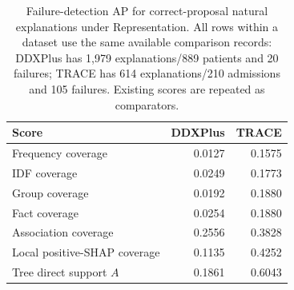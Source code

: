 \begin{table}[!htbp]
\centering\small
\caption{Failure-detection AP for correct-proposal natural explanations under Representation. All rows within a dataset use the same available comparison records: DDXPlus has 1,979 explanations/889 patients and 20 failures; TRACE has 614 explanations/210 admissions and 105 failures. Existing scores are repeated as comparators.}\label{tab:extra-natural}
\begin{tabular}{lrr}\toprule
Score & DDXPlus & TRACE\\\midrule
Frequency coverage & 0.0127 & 0.1575 \\
IDF coverage & 0.0249 & 0.1773 \\
Group coverage & 0.0192 & 0.1880 \\
Fact coverage & 0.0254 & 0.1880 \\
Association coverage & 0.2556 & 0.3828 \\
Local positive-SHAP coverage & 0.1135 & 0.4252 \\
Tree direct support $A$ & 0.1861 & 0.6043 \\
\bottomrule\end{tabular}
\end{table}
